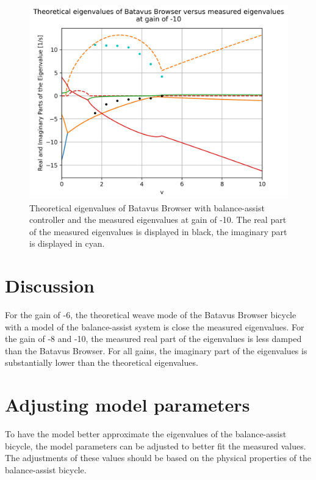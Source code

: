\documentclass[12pt]{article}
\begin{document}
\begin{figure}
    \centering
    \includegraphics[width=\columnwidth]{figures/gain-10-batavus-without-rider.png}
    \caption{Theoretical eigenvalues of Batavus Browser with balance-assist controller and the measured eigenvalues at gain of -10. The real part of the measured eigenvalues is displayed in black, the imaginary part is displayed  in cyan.}
    \label{gain-10-batavus-without-rider}
\end{figure}

\section{Discussion}
For the gain of -6, the theoretical weave mode of the Batavus Browser bicycle with a model of the balance-assist system is close the measured eigenvalues. For the gain of -8 and -10, the measured real part of the eigenvalues is less damped than the Batavus Browser. For all gains, the imaginary part of the eigenvalues is substantially lower than the theoretical eigenvalues. 

\section{Adjusting model parameters}
To have the model better approximate the eigenvalues of the balance-assist bicycle, the model parameters can be adjusted to better fit the measured values. The adjustments of these values should be based on the physical properties of the balance-assist bicycle.







\end{document}
